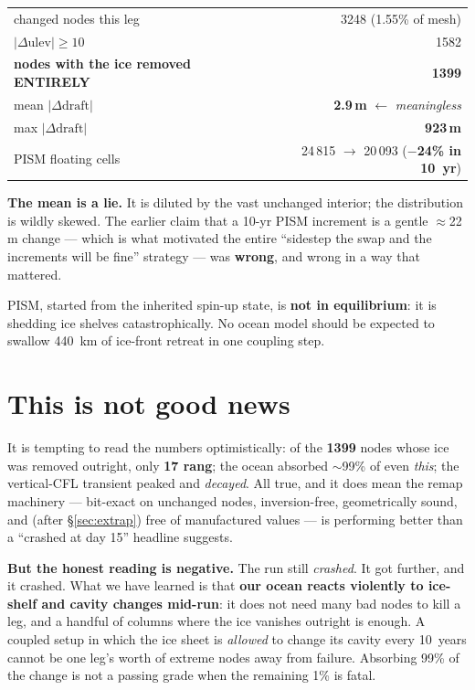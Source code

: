 \documentclass[11pt,a4paper]{article}
\begin{document}
\begin{center}
\begin{tabular}{@{}lr@{}}
\toprule
changed nodes this leg & 3248 \quad(1.55\% of mesh) \\
$|\Delta \mathrm{ulev}| \ge 10$ & 1582 \\
\textbf{nodes with the ice removed ENTIRELY} & \textbf{1399} \\
\midrule
mean $|\Delta \mathrm{draft}|$ & \textbf{2.9\,m} \quad $\leftarrow$ \emph{meaningless} \\
max $|\Delta \mathrm{draft}|$ & \textbf{923\,m} \\
PISM floating cells & 24\,815 $\to$ 20\,093 \quad(\textbf{$-$24\% in 10~yr}) \\
\bottomrule
\end{tabular}
\end{center}

\noindent
\textbf{The mean is a lie.} It is diluted by the vast unchanged interior; the distribution is wildly
skewed. The earlier claim that a 10-yr PISM increment is a gentle $\approx$22\,m change --- which is
what motivated the entire ``sidestep the swap and the increments will be fine'' strategy --- was
\textbf{wrong}, and wrong in a way that mattered.

\medskip\noindent
PISM, started from the inherited spin-up state, is \textbf{not in equilibrium}: it is shedding ice
shelves catastrophically. No ocean model should be expected to swallow 440~km of ice-front retreat
in one coupling step.

\section{This is not good news}\label{sec:sober}

It is tempting to read the numbers optimistically: of the \textbf{1399} nodes whose ice was removed
outright, only \textbf{17 rang}; the ocean absorbed $\sim$99\% of even \emph{this}; the vertical-CFL
transient peaked and \emph{decayed}. All true, and it does mean the remap machinery --- bit-exact on
unchanged nodes, inversion-free, geometrically sound, and (after \S\ref{sec:extrap}) free of
manufactured values --- is performing better than a ``crashed at day 15'' headline suggests.

\medskip\noindent
\textbf{But the honest reading is negative.} The run still \emph{crashed}. It got further, and it
crashed. What we have learned is that \textbf{our ocean reacts violently to ice-shelf and cavity
changes mid-run}: it does not need many bad nodes to kill a leg, and a handful of columns where the
ice vanishes outright is enough. A coupled setup in which the ice sheet is \emph{allowed} to change
its cavity every 10~years cannot be one leg's worth of extreme nodes away from failure. Absorbing
99\% of the change is not a passing grade when the remaining 1\% is fatal.
\end{document}
